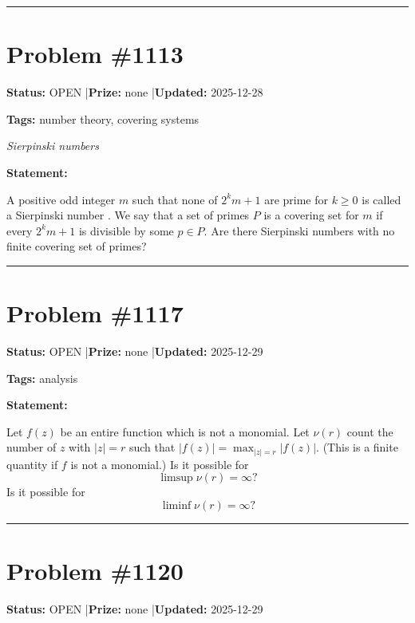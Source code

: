 \documentclass{article}
\begin{document}
\noindent\rule{\linewidth}{0.4pt}


\section{Problem \#1113}
\label{prob:1113}

\noindent\textbf{Status:} OPEN \quad|\quad \textbf{Prize:} none \quad|\quad \textbf{Updated:} 2025-12-28

\noindent\textbf{Tags:} number theory, covering systems

\medskip
\noindent\textit{Sierpinski numbers}


\noindent\textbf{Statement:}

A positive odd integer $m$ such that none of $2^km+1$ are prime for $k\geq 0$ is called a Sierpinski number . We say that a set of primes $P$ is a covering set for $m$ if every $2^km+1$ is divisible by some $p\in P$. Are there Sierpinski numbers with no finite covering set of primes?

\noindent\rule{\linewidth}{0.4pt}


\section{Problem \#1117}
\label{prob:1117}

\noindent\textbf{Status:} OPEN \quad|\quad \textbf{Prize:} none \quad|\quad \textbf{Updated:} 2025-12-29

\noindent\textbf{Tags:} analysis

\medskip

\noindent\textbf{Statement:}

Let $f(z)$ be an entire function which is not a monomial. Let $\nu(r)$ count the number of $z$ with $\lvert z\rvert=r$ such that $\lvert f(z)\rvert=\max_{\lvert z\rvert=r}\lvert f(z)\rvert$. (This is a finite quantity if $f$ is not a monomial.) Is it possible for\[\limsup \nu(r)=\infty?\]Is it possible for\[\liminf \nu(r)=\infty?\]

\noindent\rule{\linewidth}{0.4pt}


\section{Problem \#1120}
\label{prob:1120}

\noindent\textbf{Status:} OPEN \quad|\quad \textbf{Prize:} none \quad|\quad \textbf{Updated:} 2025-12-29
\end{document}
